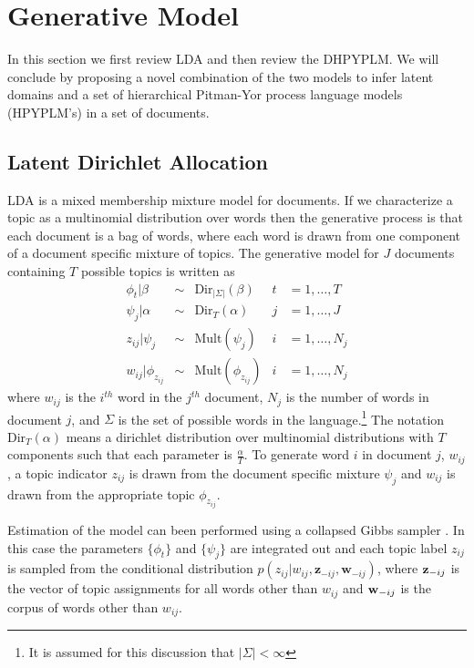 \section{Generative Model}

In this section we first review LDA and then review the DHPYPLM. We will conclude by proposing a novel combination of the two models to infer latent domains and a set of hierarchical Pitman-Yor process language models (HPYPLM's) \cite{Teh2006a} in a set of documents.

\subsection{Latent Dirichlet Allocation}

LDA is a mixed membership mixture model for documents.  If we characterize a topic as a multinomial distribution over words then the generative process is that each document is a bag of words, where each word is drawn from one component of a document specific mixture of topics. The generative model for $J$ documents containing $T$ possible topics is written as 
%
\[ 
	\begin{array} {rclcl}
		\phi_t | \beta  		&\sim& \textrm{Dir}_{|\Sigma|}(\beta)& t &= 1,\ldots,T \nonumber \\
		\psi_j | \alpha 		&\sim& \textrm{Dir}_T(\alpha) 		& j &= 1,\ldots, J \nonumber \\
		z_{ij} | \psi_j 		&\sim& \textrm{Mult}(\psi_j) 		& i &= 1,\ldots, N_j \nonumber \\
		w_{ij} | \phi_{z_{ij}} 	&\sim& \textrm{Mult}(\phi_{z_{ij}}) 	& i &= 1,\ldots, N_j \nonumber
	\end{array}
\]
%
\noindent where $w_{ij}$ is the $i^{th}$ word in the $j^{th}$ document, $N_j$ is the number of words in document $j$, and $\Sigma$ is the set of possible words in the language.\footnote{It is assumed for this discussion that $| \Sigma| < \infty$} The notation $\textrm{Dir}_T(\alpha)$ means a dirichlet distribution over multinomial distributions with $T$ components such that each parameter is $\frac{\alpha}{T}$.  To generate word $i$ in document $j$, $w_{ij}$, a topic indicator $z_{ij}$ is drawn from the document specific mixture $\psi_j$ and $w_{ij}$ is drawn from the appropriate topic $\phi_{z_{ij}}$. 

Estimation of the model can been performed using a collapsed Gibbs sampler \cite{Griffiths2004}.  In this case the parameters $\{ \phi_t \}$ and $\{ \psi_j \}$ are integrated out and each topic label $z_{ij}$ is sampled from the conditional distribution $p(z_{ij} | w_{ij}, \mathbf{z}_{-ij}, \mathbf{w}_{-ij})$, where ${\bf z}_{-ij}$ is the vector of topic assignments for all words other than $w_{ij}$ and ${\bf w}_{-ij}$ is the corpus of words other than $w_{ij}$.

